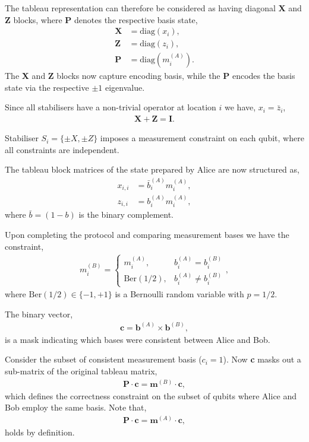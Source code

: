 \documentclass[twocolumn, aps, amsmath, amssymb, nofootinbib, superscriptaddress, longbibliography, doublefloatfix, table-of-contents, eqsecnum, rmp]{revtex4-2}
\begin{document}
The tableau representation can therefore be considered as having diagonal \textbf{X} and \textbf{Z} blocks, where \textbf{P} denotes the respective basis state,
\begin{align}
	\mathbf{X} &= \mathrm{diag}(x_i),\nonumber\\	
	\mathbf{Z} &= \mathrm{diag}(z_i),\nonumber\\
	\mathbf{P} &= \mathrm{diag}(m_i^{(A)}).
\end{align}
The \textbf{X} and \textbf{Z} blocks now capture encoding basis, while the \textbf{P} encodes the basis state via the respective $\pm 1$ eigenvalue.

Since all stabilisers have a non-trivial operator at location $i$ we have, $x_i=\bar{z}_i$,
\begin{align}
	\mathbf{X} + \mathbf{Z} = \mathbf{I}.
\end{align}

Stabiliser $S_i=\{\pm X,\pm Z\}$ imposes a measurement constraint on each qubit, where all constraints are independent.

The tableau block matrices of the state prepared by Alice are now structured as,
\begin{align}
	x_{i,i} &= \bar{b}_i^{(A)} m_i^{(A)},\nonumber\\
	z_{i,i} &= b_i^{(A)} m_i^{(A)},
\end{align}
where $\bar{b}=(1-b)$ is the binary complement.

Upon completing the protocol and comparing measurement bases we have the constraint,
\begin{align}
	m_i^{(B)} = \begin{cases}
		 m_i^{(A)}, &b_i^{(A)}=b_i^{(B)} \nonumber\\
		\mathrm{Ber}(1/2), &b_i^{(A)}\neq b_i^{(B)}
 	\end{cases},
\end{align}
where $\mathrm{Ber}(1/2)\in\{-1,+1\}$ is a Bernoulli random variable with \mbox{$p=1/2$}.

The binary vector,
\begin{align}
	\mathbf{c} = \mathbf{b}^{(A)} \times \mathbf{b}^{(B)},	
\end{align}
is a mask indicating which bases were consistent between Alice and Bob.

Consider the subset of consistent measurement basis (\mbox{$c_i=1$}). Now \textbf{c} masks out a sub-matrix of the original tableau matrix,
\begin{align} \label{eq:witness}
	\mathbf{P} \cdot \mathbf{c} = \mathbf{m}^{(B)} \cdot \mathbf{c},
\end{align}
which defines the correctness constraint on the subset of qubits where Alice and Bob employ the same basis. Note that,
\begin{align}
	\mathbf{P} \cdot \mathbf{c} = \mathbf{m}^{(A)} \cdot \mathbf{c},
\end{align}
holds by definition.
\end{document}
